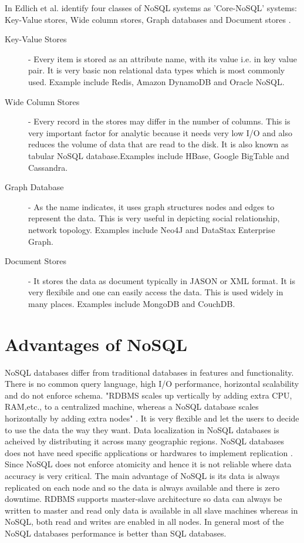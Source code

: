 \documentclass[sigconf]{acmart}
\begin{document}
In Edlich et al. identify four classes of NoSQL systems as 'Core-NoSQL' systems: Key-Value stores, Wide column stores, Graph databases and Document stores \cite{edmodel}.
\begin{description}

\item[Key-Value Stores] - Every item is stored as an attribute name, with its value i.e. in key value pair. It is very basic non relational data types which is most commonly used. Example include Redis, Amazon DynamoDB and Oracle NoSQL. 

\item[Wide Column Stores] - Every record in the stores may differ in the number of columns. This is very important factor for analytic because it needs very low I/O and also reduces the volume of data that are read to the disk. It is also known as tabular NoSQL database.Examples include HBase, Google BigTable and Cassandra.

\item[Graph Database] - As the name indicates, it uses graph structures nodes and edges to represent the data. This is very useful in depicting social relationship, network topology. Examples include Neo4J and DataStax Enterprise Graph. 

\item[Document Stores] - It stores the data as document typically in JASON or XML format. It is very flexibile and one can easily access the data. This is used widely in many places. Examples include MongoDB and CouchDB.
\end{description}

\section{Advantages of NoSQL}

NoSQL databases differ from traditional databases in features and functionality. There is no common query language, high I/O performance, horizontal scalability and do not enforce schema. "RDBMS scales up vertically by adding extra CPU, RAM,etc., to a centralized machine, whereas a NoSQL database scales horizontally by adding extra nodes" \cite{DataStax}. It is very flexible and let the users to decide to use the data the way they want. Data localization in NoSQL databases is acheived by distributing it across many geographic regions. NoSQL databases does not have need specific applications or hardwares to implement replication \cite{mongo}. Since NoSQL does not enforce atomicity and hence it is not reliable where data accuracy is very critical. The main advantage of NoSQL is its data is always replicated on each node and so the data is always available and there is zero downtime. RDBMS supports master-slave architecture so data can always be written to master and read only data is available in all slave machines whereas in NoSQL, both read and writes are enabled in all nodes. In general most of the NoSQL databases performance is better than SQL databases.
\end{document}
